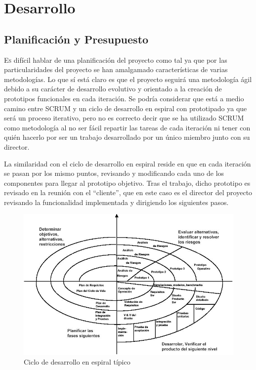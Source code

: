 \chapter{Desarrollo}
\label{chap:desarrollo}
\vspace{0.5cm}


\section{Planificación y Presupuesto}
\lettrine{E}{s} difícil hablar de una planificación del proyecto como tal ya que por las particularidades del proyecto se han amalgamado características de varias metodologías. Lo que sí está claro es que el proyecto seguirá una metodología ágil debido a su carácter de desarrollo evolutivo y orientado a la creación de prototipos funcionales en cada iteración. Se podría considerar que está a medio camino entre SCRUM y un ciclo de desarrollo en espiral con prototipado ya que será un proceso iterativo, pero no es correcto decir que se ha utilizado SCRUM como metodología al no ser fácil repartir las tareas de cada iteración ni tener con quién hacerlo por ser un trabajo desarrollado por un único miembro junto con su director. 

La similaridad con el ciclo de desarrollo en espiral reside en que en cada iteración se pasan por los mismo puntos, revisando y modificando cada uno de los componentes para llegar al prototipo objetivo. Tras el trabajo, dicho prototipo es revisado en la reunión con el ``cliente'', que en este caso es el director del proyecto revisando la funcionalidad implementada y dirigiendo los siguientes pasos.

\begin{figure}
	\centering
	\includegraphics[width=0.8\linewidth]{imagenes/espiral.jpg}
	\caption{Ciclo de desarrollo en espiral típico}
	\label{fig:ciclo_espiral}
\end{figure}

